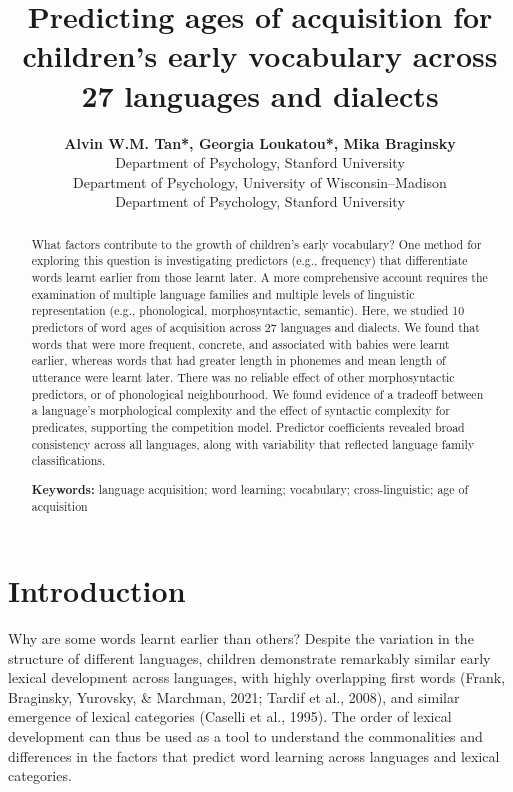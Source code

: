 \documentclass[10pt, letterpaper]{article}
\title{Predicting ages of acquisition for children's early vocabulary
across 27 languages and dialects}
\author{{\large \bf Alvin W.M. Tan*, Georgia Loukatou*, Mika Braginsky} \\ Department of Psychology, Stanford University \AND {\large \bf Jess Mankewitz} \\ Department of Psychology, University of Wisconsin--Madison \AND {\large \bf Michael C. Frank} \\ Department of Psychology, Stanford University}
\begin{document}
\maketitle

\begin{abstract}
What factors contribute to the growth of children's early vocabulary?
One method for exploring this question is investigating predictors
(e.g., frequency) that differentiate words learnt earlier from those
learnt later. A more comprehensive account requires the examination of
multiple language families and multiple levels of linguistic
representation (e.g., phonological, morphosyntactic, semantic). Here, we
studied 10 predictors of word ages of acquisition across 27 languages
and dialects. We found that words that were more frequent, concrete, and
associated with babies were learnt earlier, whereas words that had
greater length in phonemes and mean length of utterance were learnt
later. There was no reliable effect of other morphosyntactic predictors,
or of phonological neighbourhood. We found evidence of a tradeoff
between a language's morphological complexity and the effect of
syntactic complexity for predicates, supporting the competition model.
Predictor coefficients revealed broad consistency across all languages,
along with variability that reflected language family classifications.

\textbf{Keywords:}
language acquisition; word learning; vocabulary; cross-linguistic; age
of acquisition
\end{abstract}

\hypertarget{introduction}{%
\section{Introduction}\label{introduction}}

Why are some words learnt earlier than others? Despite the variation in
the structure of different languages, children demonstrate remarkably
similar early lexical development across languages, with highly
overlapping first words (Frank, Braginsky, Yurovsky, \& Marchman, 2021;
Tardif et al., 2008), and similar emergence of lexical categories
(Caselli et al., 1995). The order of lexical development can thus be
used as a tool to understand the commonalities and differences in the
factors that predict word learning across languages and lexical
categories.
\end{document}
